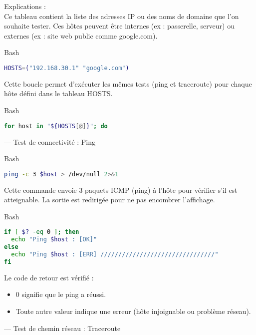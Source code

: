 \documentclass{article}
\begin{document}
Explications :
\\
Ce tableau contient la liste des adresses IP ou des noms de domaine que l’on souhaite tester. Ces hôtes peuvent être internes (ex : passerelle, serveur) ou externes (ex : site web public comme google.com).

\begin{codebox}{Bash}
\begin{lstlisting}[language=Bash]
HOSTS=("192.168.30.1" "google.com")
\end{lstlisting}
\end{codebox}

Cette boucle permet d’exécuter les mêmes tests (ping et traceroute) pour chaque hôte défini dans le tableau HOSTS.

\begin{codebox}{Bash}
\begin{lstlisting}[language=Bash]
for host in "${HOSTS[@]}"; do
\end{lstlisting}
\end{codebox}




---
Test de connectivité : Ping

\begin{codebox}{Bash}
\begin{lstlisting}[language=Bash]
ping -c 3 $host > /dev/null 2>&1
\end{lstlisting}
\end{codebox}

Cette commande envoie 3 paquets ICMP (ping) à l’hôte pour vérifier s’il est atteignable. La sortie est redirigée pour ne pas encombrer l’affichage.

\begin{codebox}{Bash}
\begin{lstlisting}[language=Bash]
if [ $? -eq 0 ]; then
  echo "Ping $host : [OK]"
else
  echo "Ping $host : [ERR] ////////////////////////////////"
fi
\end{lstlisting}
\end{codebox}


Le code de retour est vérifié :
\begin{itemize}
	\item 0 signifie que le ping a réussi.
	\item Toute autre valeur indique une erreur (hôte injoignable ou problème réseau).
\end{itemize}

---
Test de chemin réseau : Traceroute
\end{document}

